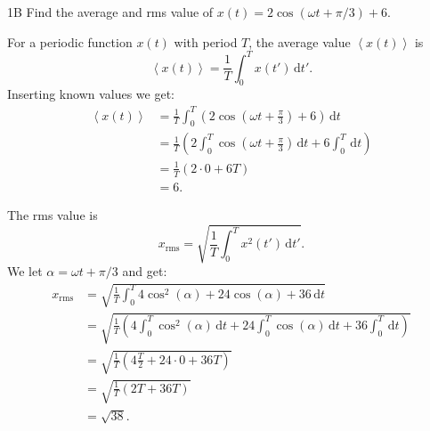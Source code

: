   \begin{problem}{1B}
    Find the average and rms value of $x(t) = 2 \cos \left( \omega t + \pi / 3 \right) + 6$.
  \end{problem}

  {\color{AUred}
  \begin{derivation}
    For a periodic function $x(t)$ with period $T$, the average value $\left\langle x(t) \right\rangle$ is
    \begin{equation*}
      \left\langle x(t) \right\rangle = \frac{1}{T} \int_{0}^{T} x(t') \, \mathrm{d}t'
    .\end{equation*}
    Inserting known values we get:
    \begin{align*}
      \left\langle x(t) \right\rangle &= \frac{1}{T} \int_{0}^{T} \left( 2 \cos \left( \omega t + \frac{\pi}{3} \right) + 6 \right) \, \mathrm{d}t   \\
      &= \frac{1}{T} \left(2 \int_{0}^{T} \cos \left( \omega t + \frac{\pi}{3} \right) \, \mathrm{d}t + 6\int_{0}^{T} \, \mathrm{d}t  \right)\\
      &= \frac{1}{T} \left( 2 \cdot 0 + 6T \right) \\
      &= 6
    .\end{align*}
    
    The rms value is
    \begin{equation*}
      x_{\mathrm{rms}} = \sqrt{\frac{1}{T} \int_{0}^{T} x^2 (t') \, \mathrm{d}t'}
    .\end{equation*}
    We let $\alpha = \omega t + \pi / 3$ and get:
    \begin{align*}
      x_{\mathrm{rms}} &= \sqrt{\frac{1}{T} \int_{0}^{T} 4 \cos^2(\alpha) + 24 \cos(\alpha) + 36 \, \mathrm{d}t}  \\
      &= \sqrt{\frac{1}{T} \left( 4 \int_{0}^{T} \cos^2(\alpha) \, \mathrm{d}t + 24 \int_{0}^{T} \cos (\alpha) \, \mathrm{d}t  + 36 \int_{0}^{T} \, \mathrm{d}t  \right)} \\
      &= \sqrt{\frac{1}{T} \left( 4 \frac{T}{2}  + 24 \cdot 0 + 36 T \right)} \\
      &= \sqrt{\frac{1}{T} \left( 2 T + 36 T \right)} \\
      &= \sqrt{38}
    .\end{align*}
  \end{derivation}
  }


